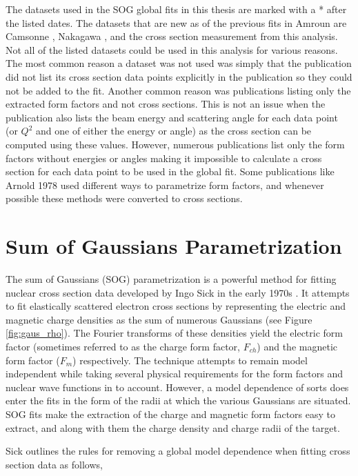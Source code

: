 The datasets used in the SOG global fits in this thesis are marked with a * after the listed dates. The datasets that are new as of the previous fits in Amroun \cite{Article:Amroun} are Camsonne \cite{Article:Alex}, Nakagawa \cite{Article:Nakagawa}, and the cross section measurement from this analysis. Not all of the listed datasets could be used in this analysis for various reasons. The most common reason a dataset was not used was simply that the publication did not list its cross section data points explicitly in the publication so they could not be added to the fit. Another common reason was publications listing only the extracted form factors and not cross sections. This is not an issue when the publication also lists the beam energy and scattering angle for each data point (or $Q^2$ and one of either the energy or angle) as the cross section can be computed using these values. However, numerous publications list only the form factors without energies or angles making it impossible to calculate a cross section for each data point to be used in the global fit. Some publications like Arnold 1978 \cite{Article:Arnold} used different ways to parametrize form factors, and whenever possible these methods were converted to cross sections.

\section{Sum of Gaussians Parametrization}
\label{sec:sog}

The sum of Gaussians (SOG) parametrization is a powerful method for fitting nuclear cross section data developed by Ingo Sick in the early 1970s \cite{Article:SOG}. It attempts to fit elastically scattered electron cross sections by representing the electric and magnetic charge densities as the sum of numerous Gaussians (see Figure \ref{fig:gaus_rho}). The Fourier transforms of these densities yield the electric form factor (sometimes referred to as the charge form factor, $F_{ch}$) and the magnetic form factor ($F_{m}$) respectively. The technique attempts to remain model independent while taking several physical requirements for the form factors and nuclear wave functions in to account. However, a model dependence of sorts does enter the fits in the form of the radii at which the various Gaussians are situated. SOG fits make the extraction of the charge and magnetic form factors easy to extract, and along with them the charge density and charge radii of the target.

Sick outlines the rules for removing a global model dependence when fitting cross section data as follows,


